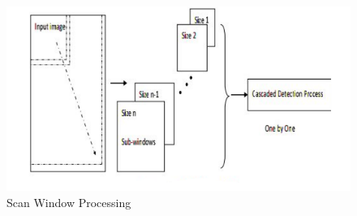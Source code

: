 \begin{itemize}
\begin{figure}[h]
  \centering
  \includegraphics[width=\linewidth]{figs/scan_crop.pdf}
  \caption{Scan Window Processing \textnormal{\small }  }
  \label{fig:scan}
\end{figure}



\end{itemize}

